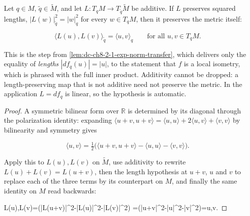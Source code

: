 \begin{lemma}
  \label{lem:dc-ch8-2-1-polarization}


  Let $q\in M$, $\tilde q\in\tilde M$, and let $L:T_qM\to T_{\tilde q}\tilde M$ be additive. If
  $L$ preserves squared lengths, $|L(w)|^2_{\tilde q}=|w|^2_q$ for every $w\in T_qM$, then it
  preserves the metric itself:

  $$
  \langle L(u),L(v)\rangle_{\tilde q} = \langle u,v\rangle_q
  \qquad\text{for all } u,v\in T_qM .
  $$

  This is the step from \cref{lem:dc-ch8-2-1-exp-norm-transfer}, which delivers only the
  equality of \emph{lengths} $|df_q(u)|=|u|$, to the statement that $f$ is a local isometry,
  which is phrased with the full inner product. Additivity cannot be dropped: a
  length-preserving map that is not additive need not preserve the metric. In the application
  $L=df_q$ is linear, so the hypothesis is automatic.
\end{lemma}
\begin{proof}

\sketch
  A symmetric bilinear form over $\mathbb R$ is determined by its diagonal through the
  polarization identity: expanding $\langle u+v,u+v\rangle=\langle u,u\rangle+2\langle
  u,v\rangle+\langle v,v\rangle$ by bilinearity and symmetry gives

  $$
  \langle u,v\rangle=\tfrac12\big(\langle u+v,u+v\rangle-\langle u,u\rangle-\langle
  v,v\rangle\big).
  $$

  Apply this to $L(u),L(v)$ on $\tilde M$, use additivity to rewrite $L(u)+L(v)=L(u+v)$, then
  the length hypothesis at $u+v$, $u$ and $v$ to replace each of the three terms by its
  counterpart on $M$, and finally the same identity on $M$ read backwards:

  \langle L(u),L(v)\rangle=\big(|L(u+v)|^2-|L(u)|^2-|L(v)|^2\big)
  =\big(|u+v|^2-|u|^2-|v|^2\big)=\langle u,v\rangle. \qquad

\end{proof}

